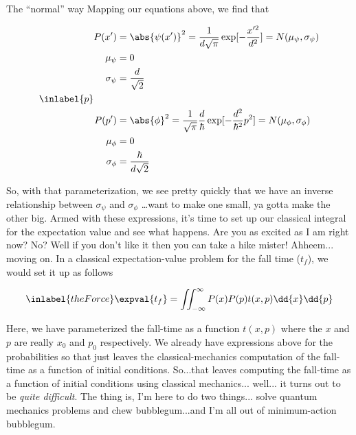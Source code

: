 \begin{answer}
\begin{answerpart}{The ``normal'' way}
    Mapping our equations above, we find that

    \begin{equation}
      \inlabel{p}
      \begin{split}
        P(x')
        &= \abs{\psi(x')}^2
        = \frac{1}{d\sqrt{\pi}} \exp[-\frac{x'^{2}}{d^2}]
        = N(\mu_\psi, \sigma_\psi)
        \\
        \mu_\psi &= 0\\
        \sigma_\psi &= \frac{d}{\sqrt{2}}\\
        \\
        P(p')
        &= \abs{\phi}^2
        = \frac{1}{\sqrt{\pi}} \frac{d}{\hbar} \exp[-\frac{d^2}{\hbar^2}p^2]
        = N(\mu_\phi, \sigma_\phi)
        \\
        \mu_\phi &= 0\\
        \sigma_\phi &= \frac{\hbar}{d\sqrt{2}}\\
      \end{split}
    \end{equation}

    So, with that parameterization, we see pretty quickly that we have
    an inverse relationship between $\sigma_\psi$ and $\sigma_\phi$
    \ldots want to make one small, ya gotta make the other big.  Armed
    with these expressions, it's time to set up our classical integral
    for the expectation value and see what happens.  Are you as
    excited as I am right now?  No?  Well if you don't like it then
    you can take a hike mister!  Ahheem... moving on.  In a classical
    expectation-value problem for the fall time ($t_f$), we would set
    it up as follows

    \begin{equation}
      \inlabel{theForce}
      \expval{t_f} = \iint_{-\infty}^{\infty} P(x)P(p)t(x, p) \dd{x} \dd{p}
    \end{equation}

    Here, we have parameterized the fall-time as a function $t(x, p)$
    where the $x$ and $p$ are really $x_0$ and $p_0$ respectively.  We
    already have expressions above for the probabilities so that just
    leaves the classical-mechanics computation of the fall-time as a
    function of initial conditions.  So...that leaves computing the
    fall-time as a function of initial conditions using classical
    mechanics... well... it turns out to be \emph{quite difficult}.
    The thing is, I'm here to do two things... solve quantum mechanics
    problems and chew bubblegum...and I'm all out of minimum-action
    bubblegum.


\end{answerpart}
\end{answer}
